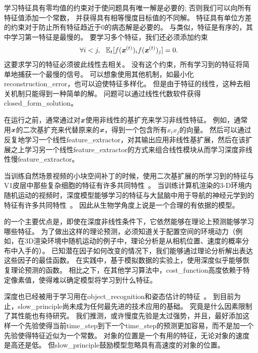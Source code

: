 
学习特征具有零均值的约束对于使问题具有唯一解是必要的; 
否则我们可以向所有特征值添加一个常数，
并获得具有相等慢度目标值的不同解。
特征具有单位方差的约束对于防止所有特征趋近于$0$的病态解是必要的。
与类似，特征是有序的，其中学习第一特征是最慢的。
要学习多个特征，我们还必须添加约束
\begin{align}
\label{eqn:1311}
\forall i<j,\ \  \mathbb{E}_t [f(\boldsymbol{\mathit{x}}^{(t)})_i  f(\boldsymbol{\mathit{x}}^{(t)})_j] = 0.
\end{align}
这要求学习的特征必须彼此线性去相关。 
没有这个约束，所有学习到的特征将简单地捕获一个最慢的信号。
可以想象使用其他机制，如最小化\gls{reconstruction_error}，也可以迫使特征多样化。
但是由于特征的线性，这种去相关机制只能得到一种简单的解。 
问题可以通过线性代数软件获得\gls{closed_form_solution}。



在运行之前，通常通过对$\boldsymbol{\mathit{x}}$使用非线性的基扩充来学习非线性特征。
例如，通常用$\boldsymbol{\mathit{x}}$的二次基扩充来代替原来的$\boldsymbol{\mathit{x}}$，得到一个包含所有$x_ix_j$的向量。
然后可以通过反复地学习一个线性\gls{feature_extractor}，对其输出应用非线性基扩展，然后在该扩展之上学习另一个线性\gls{feature_extractor}的方式来组合线性模块从而学习深度非线性慢\gls{feature_extractor}。



当训练自然场景视频的小块空间补丁的时候，使用二次基扩展的所学习到的特征与V1皮层中那些复杂细胞的特征有许多共同特性~\citep{Berkes-Wiskott-2005}。
当训练计算机渲染的3-D环境内随机运动的视频时，深度模型能够学习的特征与大鼠脑中用于导航的神经元学到的特征有许多共同特性~\citep{franzius2007slowness}。
因此从生物学角度上说是一个合理的有依据的模型。



的一个主要优点是，即使在深度非线性条件下，它依然能够在理论上预测能够学习哪些特征。
为了做出这样的理论预测，必须知道关于配置空间的环境动力（例如，在3D渲染环境中随机运动的例子中，理论分析是从相机位置、速度的概率分布中入手的）。
已知潜在因子如何改变的情况下，我们能够通过理论分析解出表达这些因子的最佳函数。
在实践中，基于模拟数据的实验上，使用深度似乎能够恢复理论预测的函数。
相比之下，在其他学习算法中，\gls{cost_function}高度依赖于特定像素值，使得难以确定模型将学习到什么特征。


深度也已经被用于学习用在\gls{object_recognition}和姿态估计的特征~\citep{Franzius2008}。
到目前为止，\gls{slow_principle}尚未成为任何最先进的技术应用的基础。
究竟是什么因素限制了其性能也有待研究。
我们推测，或许慢度先验是太过强势，并且，最好添加这样一个先验使得当前\gls{time_step}到下一个\gls{time_step}的预测更加容易，而不是加一个先验使得特征近似为一个常数。
对象的位置是一个有用的特征，无论对象的速度是高还是低。 
但\gls{slow_principle}鼓励模型忽略具有高速度的对象的位置。


